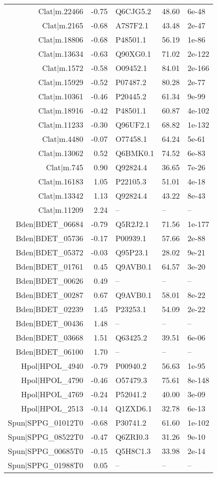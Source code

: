 \begin{table}[tbp]
{{\begin{tabular}{rrlll}
  Clat$|$m.22466 & -0.75 & Q6CJG5.2 & 48.60 & 6e-48 \\ 
  Clat$|$m.2165 & -0.68 & A7S7F2.1 & 43.48 & 2e-47 \\ 
  Clat$|$m.18806 & -0.68 & P48501.1 & 56.19 & 1e-86 \\ 
  Clat$|$m.13634 & -0.63 & Q90XG0.1 & 71.02 & 2e-122 \\ 
  Clat$|$m.1572 & -0.58 & O09452.1 & 84.01 & 2e-166 \\ 
  Clat$|$m.15929 & -0.52 & P07487.2 & 80.28 & 2e-77 \\ 
  Clat$|$m.10361 & -0.46 & P20445.2 & 61.34 & 9e-99 \\ 
  Clat$|$m.18916 & -0.42 & P48501.1 & 60.87 & 4e-102 \\ 
  Clat$|$m.11233 & -0.30 & Q96UF2.1 & 68.82 & 1e-132 \\ 
  Clat$|$m.4480 & -0.07 & O77458.1 & 64.24 & 5e-61 \\ 
  Clat$|$m.13062 & 0.52 & Q6BMK0.1 & 74.52 & 6e-83 \\ 
  Clat$|$m.745 & 0.90 & Q92824.4 & 36.65 & 7e-26 \\ 
  Clat$|$m.16183 & 1.05 & P22105.3 & 51.01 & 4e-18 \\ 
  Clat$|$m.13342 & 1.13 & Q92824.4 & 43.22 & 8e-43 \\ 
  Clat$|$m.11209 & 2.24 & -- & -- & -- \\ 
  Bden$|$BDET\_06684 & -0.79 & Q5R2J2.1 & 71.56 & 1e-177 \\ 
  Bden$|$BDET\_05736 & -0.17 & P00939.1 & 57.66 & 2e-88 \\ 
  Bden$|$BDET\_05372 & -0.03 & Q95P23.1 & 28.02 & 9e-21 \\ 
  Bden$|$BDET\_01761 & 0.45 & Q9AVB0.1 & 64.57 & 3e-20 \\ 
  Bden$|$BDET\_00626 & 0.49 & -- & -- & -- \\ 
  Bden$|$BDET\_00287 & 0.67 & Q9AVB0.1 & 58.01 & 8e-22 \\ 
  Bden$|$BDET\_02239 & 1.45 & P23253.1 & 54.09 & 2e-22 \\ 
  Bden$|$BDET\_00436 & 1.48 & -- & -- & -- \\ 
  Bden$|$BDET\_03668 & 1.51 & Q63425.2 & 39.51 & 6e-06 \\ 
  Bden$|$BDET\_06100 & 1.70 & -- & -- & -- \\ 
  Hpol$|$HPOL\_4940 & -0.79 & P00940.2 & 56.63 & 1e-95 \\ 
  Hpol$|$HPOL\_4790 & -0.46 & O57479.3 & 75.61 & 8e-148 \\ 
  Hpol$|$HPOL\_4769 & -0.24 & P52041.2 & 40.00 & 3e-09 \\ 
  Hpol$|$HPOL\_2513 & -0.14 & Q1ZXD6.1 & 32.78 & 6e-13 \\ 
  Spun$|$SPPG\_01012T0 & -0.68 & P30741.2 & 61.60 & 1e-102 \\ 
  Spun$|$SPPG\_08522T0 & -0.47 & Q6ZRI0.3 & 31.26 & 9e-10 \\ 
  Spun$|$SPPG\_00685T0 & -0.15 & Q5H8C1.3 & 33.98 & 2e-14 \\ 
  Spun$|$SPPG\_01988T0 & 0.05 & -- & -- & -- \\ 
   \hline
\end{tabular}
}
}
\end{table}
